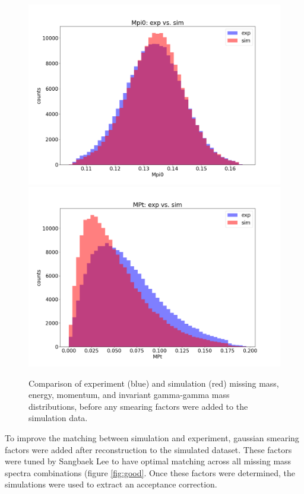 \begin{figure}[hbt]
	\includegraphics[page=133,width=0.3\linewidth]{Chapters/Ch4-BaseAnalysis/0_preprocessing/0_B_simulation_data_preprocessing/pics/nosmear/outbending_rad_All_All_All_no_smearingMpi0_exp_vs_sim.png}
	\includegraphics[page=135,width=0.3\linewidth]{Chapters/Ch4-BaseAnalysis/0_preprocessing/0_B_simulation_data_preprocessing/pics/nosmear/outbending_rad_All_All_All_no_smearingMPt_exp_vs_sim.png}
	
	\caption{Comparison of experiment (blue) and simulation (red) missing mass, energy, momentum, and invariant gamma-gamma mass distributions, before any smearing factors were added to the simulation data.}
	\label{fig:bad}
\end{figure}



To improve the matching between simulation and experiment, gaussian smearing factors were added after reconstruction to the simulated dataset. These factors were tuned by Sangbaek Lee to have optimal matching across all missing mass spectra combinations (figure \ref{fig:good}. Once these factors were determined, the simulations were used to extract an acceptance correction.


